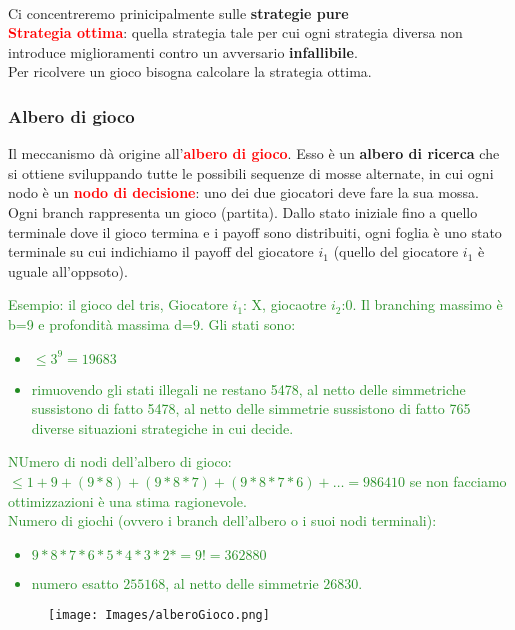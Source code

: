 \documentclass{article}
\begin{document}
\\Ci concentreremo prinicipalmente sulle \textbf{strategie pure}
\\ \textbf{\textcolor{red}{Strategia ottima}}: quella strategia tale per cui ogni strategia diversa non introduce miglioramenti contro un avversario \textbf{infallibile}. 
\\Per ricolvere un gioco bisogna calcolare la strategia ottima.

\subsubsection{Albero di gioco}
Il meccanismo dà origine all'\textbf{\textcolor{red}{albero di gioco}}. Esso è un \textbf{albero di ricerca} che si ottiene sviluppando tutte le possibili sequenze di mosse alternate, in cui ogni nodo è un \textbf{\textcolor{red}{nodo di decisione}}: uno dei due giocatori deve fare la sua mossa.
\\ Ogni branch rappresenta un gioco (partita). Dallo stato iniziale fino a quello terminale dove il gioco termina e i payoff sono distribuiti, ogni foglia è uno stato terminale su cui indichiamo il payoff del giocatore $i_1$ (quello del giocatore $i_1$ è uguale all'oppsoto).
\textcolor{ForestGreen}{Esempio: il gioco del tris, Giocatore $i_1$: X, giocaotre $i_2$:0. Il branching massimo è b=9 e profondità massima d=9. Gli stati sono: \begin{itemize}
    \item $\leq 3^9=19683$
    \item rimuovendo gli stati illegali ne restano 5478, al netto delle simmetriche sussistono di fatto 5478, al netto delle simmetrie sussistono di fatto 765 diverse situazioni strategiche in cui decide.
    \end{itemize}
NUmero di nodi dell'albero di gioco: $\leq 1+9+(9*8)+(9*8*7)+(9*8*7*6)+ \dots = 986410$ se non facciamo ottimizzazioni è una stima ragionevole.
\\ Numero di giochi (ovvero i branch dell'albero o i suoi nodi terminali):\begin{itemize}
    \item $9*8*7*6*5*4*3*2*=9!=362880$
    \item numero esatto $255168$, al netto delle simmetrie $26830$.
\end{itemize}}
\begin{figure}[H]
    \centering
    \texttt{[image: Images/alberoGioco.png]}
\end{figure}
\end{document}

